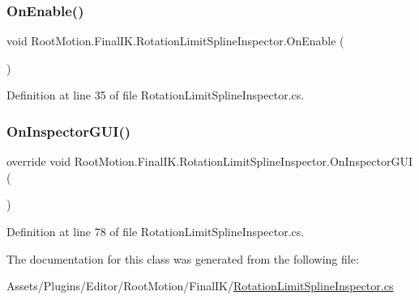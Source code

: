 \subsubsection{\texorpdfstring{On\+Enable()}{OnEnable()}}
{\footnotesize\ttfamily void Root\+Motion.\+Final\+I\+K.\+Rotation\+Limit\+Spline\+Inspector.\+On\+Enable (\begin{DoxyParamCaption}{ }\end{DoxyParamCaption})}



Definition at line 35 of file Rotation\+Limit\+Spline\+Inspector.\+cs.

\mbox{\label{class_root_motion_1_1_final_i_k_1_1_rotation_limit_spline_inspector_aa3babc54f54cda37f60343ceb42c8009}} 
\subsubsection{\texorpdfstring{On\+Inspector\+G\+U\+I()}{OnInspectorGUI()}}
{\footnotesize\ttfamily override void Root\+Motion.\+Final\+I\+K.\+Rotation\+Limit\+Spline\+Inspector.\+On\+Inspector\+G\+UI (\begin{DoxyParamCaption}{ }\end{DoxyParamCaption})}



Definition at line 78 of file Rotation\+Limit\+Spline\+Inspector.\+cs.



The documentation for this class was generated from the following file\+:\begin{DoxyCompactItemize}
\item 
Assets/\+Plugins/\+Editor/\+Root\+Motion/\+Final\+I\+K/\mbox{\hyperlink{_rotation_limit_spline_inspector_8cs}{Rotation\+Limit\+Spline\+Inspector.\+cs}}\end{DoxyCompactItemize}
